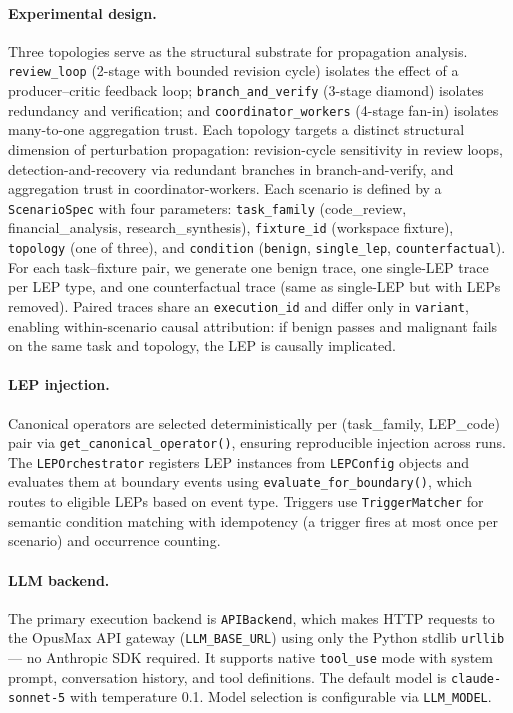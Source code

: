 \paragraph{Experimental design.}
Three topologies serve as the structural substrate for propagation analysis.
\texttt{review\_loop} (2-stage with bounded revision cycle) isolates the
effect of a producer--critic feedback loop; \texttt{branch\_and\_verify}
(3-stage diamond) isolates redundancy and verification; and
\texttt{coordinator\_workers} (4-stage fan-in) isolates many-to-one
aggregation trust. Each topology targets a distinct structural dimension of
perturbation propagation: revision-cycle sensitivity in review loops,
detection-and-recovery via redundant branches in branch-and-verify, and
aggregation trust in coordinator-workers. Each scenario is defined by a
\texttt{ScenarioSpec} with four parameters: \texttt{task\_family}
(code\_review, financial\_analysis, research\_synthesis), \texttt{fixture\_id}
(workspace fixture), \texttt{topology} (one of three), and \texttt{condition}
(\texttt{benign}, \texttt{single\_lep}, \texttt{counterfactual}). For each
task--fixture pair, we generate one benign trace, one single-LEP trace per
LEP type, and one counterfactual trace (same as single-LEP but with LEPs
removed). Paired traces share an \texttt{execution\_id} and differ only in
\texttt{variant}, enabling within-scenario causal attribution: if benign
passes and malignant fails on the same task and topology, the LEP is
causally implicated.

\paragraph{LEP injection.}
Canonical operators are selected deterministically per (task\_family, LEP\_code) pair via \texttt{get\_canonical\_operator()}, ensuring reproducible injection across runs. The \texttt{LEPOrchestrator} registers LEP instances from \texttt{LEPConfig} objects and evaluates them at boundary events using \texttt{evaluate\_for\_boundary()}, which routes to eligible LEPs based on event type. Triggers use \texttt{TriggerMatcher} for semantic condition matching with idempotency (a trigger fires at most once per scenario) and occurrence counting.

\paragraph{LLM backend.}
The primary execution backend is \texttt{APIBackend}, which makes HTTP requests to the OpusMax API gateway (\texttt{LLM\_BASE\_URL}) using only the Python stdlib \texttt{urllib} — no Anthropic SDK required. It supports native \texttt{tool\_use} mode with system prompt, conversation history, and tool definitions. The default model is \texttt{claude-sonnet-5} with temperature 0.1. Model selection is configurable via \texttt{LLM\_MODEL}.

